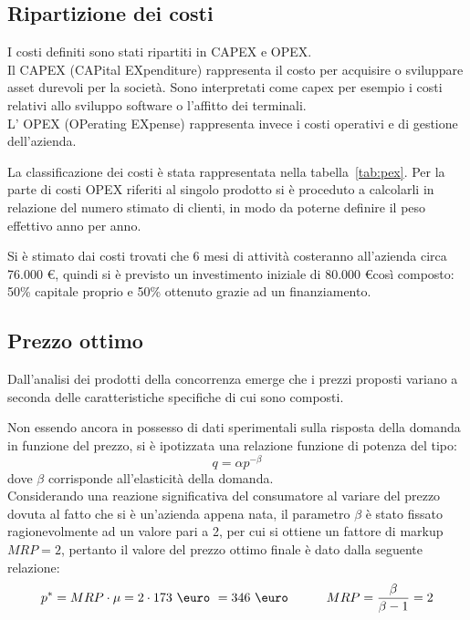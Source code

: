 \subsection{Ripartizione dei costi}
I costi definiti sono stati ripartiti in CAPEX e OPEX.\\
Il CAPEX (CAPital EXpenditure) rappresenta il costo per acquisire o sviluppare
asset durevoli per la società. Sono interpretati come capex per esempio i costi
relativi allo sviluppo software o l’affitto dei terminali.\\
L’ OPEX (OPerating EXpense) rappresenta invece i costi operativi e di gestione
dell’azienda.

La classificazione dei costi è stata rappresentata nella tabella~\ref{tab:pex}.
Per la parte di costi OPEX riferiti al singolo prodotto si è proceduto a
calcolarli in relazione del numero stimato di clienti, in modo da poterne
definire il peso effettivo anno per anno.


Si è stimato dai costi trovati che 6 mesi di attività costeranno all’azienda
circa 76.000 \euro, quindi si è previsto un investimento iniziale di 80.000
\euro così composto: 50\% capitale proprio e 50\% ottenuto grazie ad un
finanziamento.
\subsection{Prezzo ottimo}
Dall'analisi dei prodotti della concorrenza emerge che i prezzi proposti variano
a seconda delle caratteristiche specifiche di cui sono composti.

Non essendo ancora in possesso di dati sperimentali sulla risposta della domanda
in funzione del prezzo, si è ipotizzata una relazione funzione di potenza del
tipo: 
\begin{displaymath}
q = \alpha p^{-\beta}
\end{displaymath}
dove $\beta$ corrisponde all’elasticità della domanda.\\
Considerando una reazione significativa del consumatore al variare del prezzo
dovuta al fatto che si è un’azienda appena nata, il parametro $\beta$ è stato
fissato ragionevolmente ad un valore pari a 2, per cui si ottiene un fattore di
markup $MRP=2$, pertanto il valore del prezzo ottimo finale è dato dalla
seguente relazione:
\begin{displaymath}
	p^* = MRP \cdot \mu =  2 \cdot 173 \ \mbox{\euro} \ = 346 \ \mbox{\euro}
\qquad\quad    MRP = \frac{\beta}{\beta-1} = 2
\end{displaymath}
